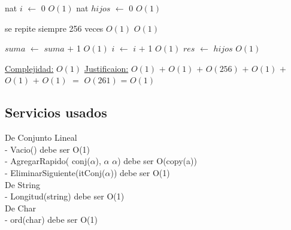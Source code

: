 \begin{Algoritmos}
\begin{algorithm}[H]
\begin{algorithmic}[1]
\State nat $i$ $\gets$ 0 \Comment $O(1)$
\State nat $hijos$ $\gets$ 0 \Comment $O(1)$

 \Comment se repite siempre 256 veces $O(1)$
	 \State $O(1)$

	\State $suma$ $\gets$ $suma$ $+$ 1 \Comment $O(1)$
	\State $i$ $\gets$ $i$ $+$ 1 \Comment $O(1)$
	\EndIf
\EndWhile
\State $res$ $\gets$ $hijos$ \Comment $O(1)$


\medskip
\State \underline{Complejidad:} $O(1)$
\State \underline{Justificaion:}  $O(1)$ $+$ $O(1)$ $+$ $O(256)$ $+$ $O(1)$ $+$ $O(1)$ $+$ $O(1)$ $=$ $O(261)$ = $O(1)$

\end{algorithmic}
\end{algorithm}


\end{Algoritmos}


\subsection{Servicios usados}

De Conjunto Lineal \\
 - Vacio() debe ser O(1) \\
 - AgregarRapido( conj($\alpha$), $\alpha$ $\alpha$) debe ser O(copy(a)) \\
 - EliminarSiguiente(itConj($\alpha$)) debe ser O(1) \\

De String \\
 - Longitud(string) debe ser O(1) \\

De Char \\
 - ord(char) debe ser O(1) \\

